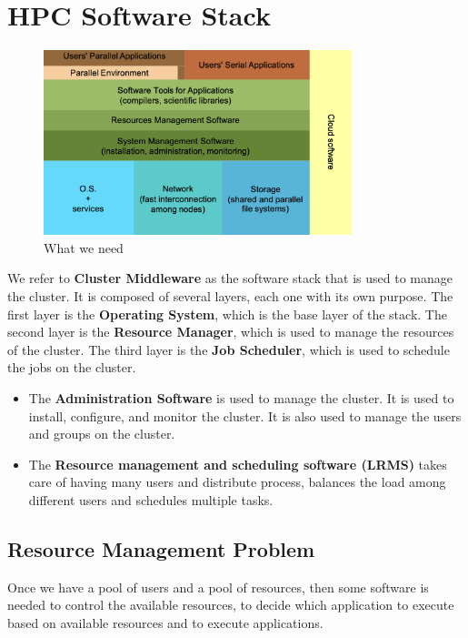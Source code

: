 
\chapter{HPC Software Stack}

\begin{figure}[H]
    \centering
    \includegraphics[width=0.8\textwidth]{assets/fig13.png}
    \caption{What we need}
    \label{fig:hpc_software_stack}
\end{figure}

We refer to \textbf{Cluster Middleware} as the software stack that is used to manage the cluster. It is composed of several layers, each one with its own purpose. The first layer is the \textbf{Operating System}, which is the base layer of the stack. The second layer is the \textbf{Resource Manager}, which is used to manage the resources of the cluster. The third layer is the \textbf{Job Scheduler}, which is used to schedule the jobs on the cluster.

\begin{itemize}
    \item The \textbf{Administration Software} is used to manage the cluster. It is used to install, configure, and monitor the cluster. It is also used to manage the users and groups on the cluster.
    \item The \textbf{Resource management and scheduling software (LRMS)} takes care of having many users and distribute process, balances the load among different users and schedules multiple tasks.
\end{itemize}

\section{Resource Management Problem}

Once we have a pool of users and a pool of resources, then some software is needed to control the available resources, to decide which application to execute based on available resources and to execute applications.

